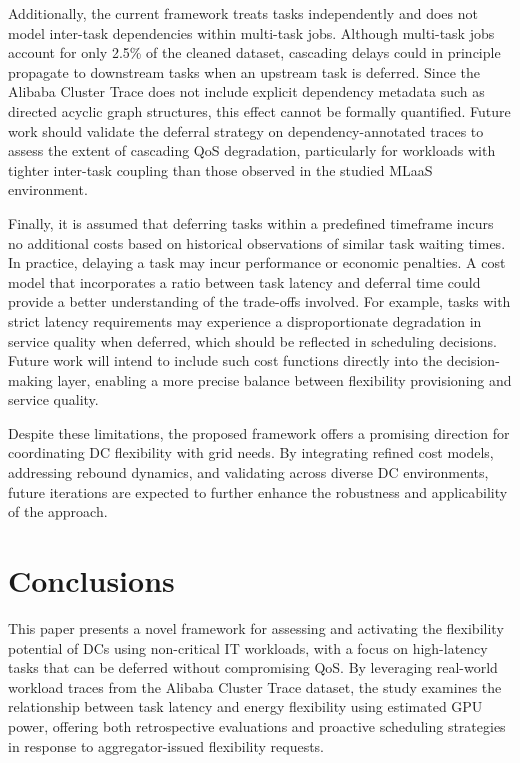 \documentclass[preprint,12pt]{elsarticle}
\begin{document}
Additionally, the current framework treats tasks independently and does not model inter-task dependencies within multi-task jobs. Although multi-task jobs account for only 2.5\% of the cleaned dataset, cascading delays could in principle propagate to downstream tasks when an upstream task is deferred. Since the Alibaba Cluster Trace does not include explicit dependency metadata such as directed acyclic graph structures, this effect cannot be formally quantified. Future work should validate the deferral strategy on dependency-annotated traces to assess the extent of cascading QoS degradation, particularly for workloads with tighter inter-task coupling than those observed in the studied MLaaS environment.

Finally, it is assumed that deferring tasks within a predefined timeframe incurs no additional costs based on historical observations of similar task waiting times. In practice, delaying a task may incur performance or economic penalties. A cost model that incorporates a ratio between task latency and deferral time could provide a better understanding of the trade-offs involved. For example, tasks with strict latency requirements may experience a disproportionate degradation in service quality when deferred, which should be reflected in scheduling decisions. Future work will intend to include such cost functions directly into the decision-making layer, enabling a more precise balance between flexibility provisioning and service quality.

Despite these limitations, the proposed framework offers a promising direction for coordinating DC flexibility with grid needs. By integrating refined cost models, addressing rebound dynamics, and validating across diverse DC environments, future iterations are expected to further enhance the robustness and applicability of the approach.

%

%
%

%
%
%
%
%
%


%
%
%


\section{Conclusions}\label{conclusion}

This paper presents a novel framework for assessing and activating the flexibility potential of DCs using non-critical IT workloads, with a focus on high-latency tasks that can be deferred without compromising QoS. By leveraging real-world workload traces from the Alibaba Cluster Trace dataset, the study examines the relationship between task latency and energy flexibility using estimated GPU power, offering both retrospective evaluations and proactive scheduling strategies in response to aggregator-issued flexibility requests.
\end{document}
